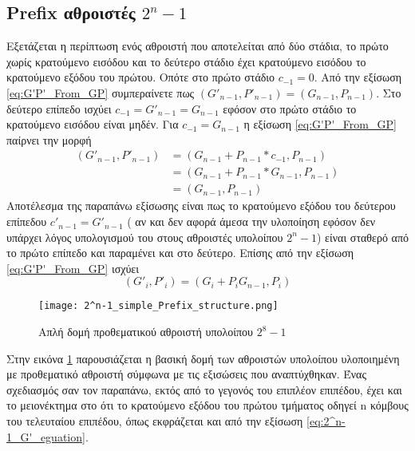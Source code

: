 \subsection{Prefix αθροιστές $2^n-1$ }
Εξετάζεται η περίπτωση ενός αθροιστή που αποτελείται από δύο στάδια, το πρώτο χωρίς κρατούμενο εισόδου
και το δεύτερο στάδιο έχει κρατούμενο εισόδου το κρατούμενο εξόδου του πρώτου. Οπότε στο
πρώτο στάδιο $c_{-1} = 0$. Από την εξίσωση \ref{eq:G'P'_From_GP} συμπεραίνετε πως 
$(G'_{n-1},P'_{n-1}) = (G_{n-1},P_{n-1})$. Στο δεύτερο επίπεδο ισχύει 
$c_{-1} = G'_{n-1} = G_{n-1} $ εφόσον στο πρώτο στάδιο το κρατούμενο εισόδου είναι μηδέν.
Για $c_{-1} = G_{n-1}$ η εξίσωση \ref{eq:G'P'_From_GP} παίρνει την μορφή 
\begin{equation*}
\begin{split}
    (G'_{n-1},P'_{n-1}) &= ( G_{n-1} + P_{n-1}*c_{-1} ,  P_{n-1} )\\
    &=( G_{n-1} + P_{n-1}*G_{n-1} ,  P_{n-1} )\\
    &=(G_{n-1},P_{n-1})
\end{split}    
\end{equation*}
Αποτέλεσμα της παραπάνω εξίσωσης είναι πως το κρατούμενο εξόδου του δεύτερου επίπεδου 
$c'_{n-1} = G'_{n-1}$
( αν και δεν αφορά άμεσα την υλοποίηση εφόσον δεν υπάρχει λόγος υπολογισμού του 
στους αθροιστές υπολοίπου $2^n-1$) είναι σταθερό από το πρώτο επίπεδο και παραμένει και στο 
δεύτερο. Επίσης από την εξίσωση \ref{eq:G'P'_From_GP} ισχύει 
\begin{equation}
\label{eq:2^n-1_G'_eguation}
    (G'_i,P'_i) = (G_i + P_iG_{n-1} , P_{i})
\end{equation}

\begin{figure}[H]
    \centering
    \texttt{[image: 2^n-1\_simple\_Prefix\_structure.png]}
    \caption{Απλή δομή προθεματικού αθροιστή υπολοίπου $2^8-1$}
    \label{fig:2^n-1_simple_Prefix_structure}
\end{figure}
Στην εικόνα \ref{fig:2^n-1_simple_Prefix_structure} παρουσιάζεται η βασική δομή των αθροιστών υπολοίπου υλοποιημένη με προθεματικό αθροιστή σύμφωνα με τις εξισώσεις που αναπτύχθηκαν.
Ένας σχεδιασμός σαν τον παραπάνω, εκτός από το γεγονός του επιπλέον επιπέδου,
έχει και το μειονέκτημα στο ότι το κρατούμενο εξόδου του πρώτου τμήματος οδηγεί 
n κόμβους του τελευταίου επιπέδου, όπως εκφράζεται και από την εξίσωση \ref{eq:2^n-1_G'_eguation}.

















